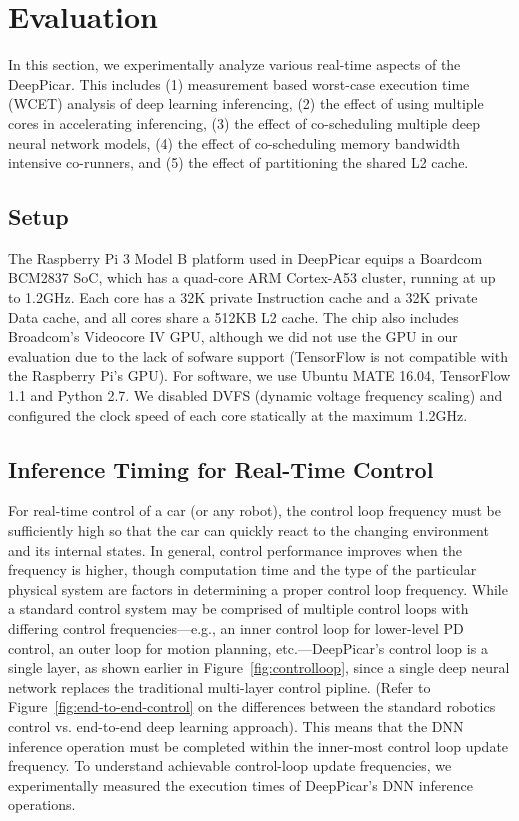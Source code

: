 
\section{Evaluation}\label{sec:evaluation}

In this section, we experimentally analyze various real-time aspects
of the DeepPicar. This includes
(1) measurement based worst-case execution time (WCET) analysis of
deep learning inferencing,
(2) the effect of using multiple cores in accelerating inferencing,
(3) the effect of co-scheduling multiple deep neural network models,
(4) the effect of co-scheduling memory bandwidth intensive co-runners,
and
(5) the effect of partitioning the shared L2 cache.

\subsection{Setup}

The Raspberry Pi 3 Model B platform used in DeepPicar equips a Boardcom
BCM2837 SoC, which has a quad-core ARM Cortex-A53 cluster,
running at up to 1.2GHz. Each core has a 32K private Instruction cache
and a 32K private Data cache, and all cores share a 512KB L2 cache.
The chip also includes Broadcom's Videocore IV
GPU, although we did not use the GPU in our evaluation due to the lack
of sofware support (TensorFlow is not compatible with the Raspberry Pi's GPU).
For software, we use Ubuntu MATE 16.04, TensorFlow 1.1 and Python
2.7. We disabled DVFS (dynamic voltage frequency scaling) and
configured the clock speed of each core statically at the maximum 1.2GHz.

\subsection{Inference Timing for Real-Time Control}

For real-time control of a car (or any robot), the control loop
frequency must be sufficiently high so that the car can quickly
react to the changing environment and its internal states. In general,
control performance improves when the frequency is higher, though
computation time and the type of the particular physical system are
factors in determining a proper control loop frequency. While a standard
control system may be comprised of multiple control loops with
differing control frequencies---e.g., an inner control loop for lower-level
PD control, an outer loop for motion planning, etc.---DeepPicar's
control loop is a single layer, as shown earlier in
Figure~\ref{fig:controlloop}, since a single deep neural network
replaces the traditional multi-layer control pipline. (Refer to
Figure~\ref{fig:end-to-end-control} on the differences between the
standard robotics control vs. end-to-end deep learning approach).
This means that the DNN inference operation must be completed
within the inner-most control loop update frequency. To understand
achievable control-loop update frequencies, we experimentally measured
the execution times of DeepPicar's DNN inference operations.

